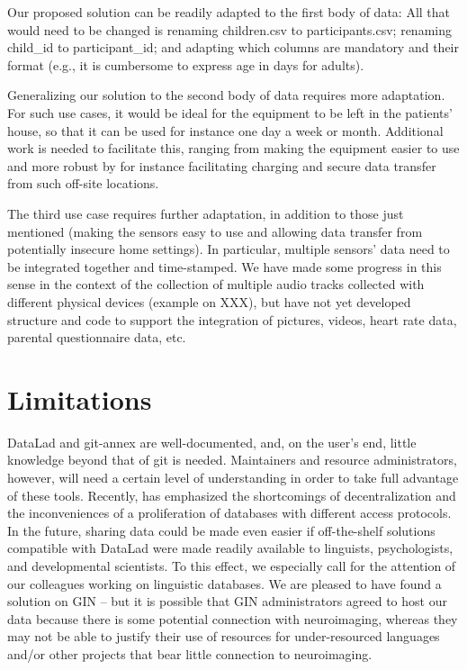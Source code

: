 \documentclass[smallextended]{svjour3}       %
\begin{document}
Our proposed solution can be readily adapted to the first body of data: All that would need to be changed is renaming children.csv to participants.csv; renaming child\_id to participant\_id; and adapting which columns are mandatory and their format (e.g., it is cumbersome to express age in days for adults).

Generalizing our solution to the second body of data requires more adaptation. For such use cases, it would be ideal for the equipment to be left in the patients' house, so that it can be used for instance one day a week or month. Additional work is needed to facilitate this, ranging from making the equipment easier to use and more robust by for instance facilitating charging and secure data transfer from such off-site locations.

The third use case requires further adaptation, in addition to those just mentioned (making the sensors easy to use and allowing data transfer from potentially insecure home settings). In particular, multiple sensors' data need to be integrated together and time-stamped. We have made some progress in this sense in the context of the collection of multiple audio tracks collected with different physical devices (example on XXX), but have not yet developed structure and code to support the integration of pictures, videos, heart rate data, parental questionnaire data, etc. 

\section{Limitations}

DataLad and git-annex are well-documented, and, on the user's end, little knowledge beyond that of git is needed. Maintainers and resource administrators, however, will need a certain level of understanding in order to take full advantage of these tools.
Recently, \citet{Powell2021} has emphasized the shortcomings of decentralization and the inconveniences of a proliferation of databases with different access protocols. In the future, sharing data could be made even easier if off-the-shelf solutions compatible with DataLad were made readily available to linguists, psychologists, and developmental scientists. To this effect, we especially call for the attention of our colleagues working on linguistic databases. We are pleased to have found a solution on GIN -- but it is possible that GIN administrators agreed to host our data because there is some potential connection with neuroimaging, whereas they may not be able to justify their use of resources for under-resourced languages and/or other projects that bear little connection to neuroimaging.
\end{document}
